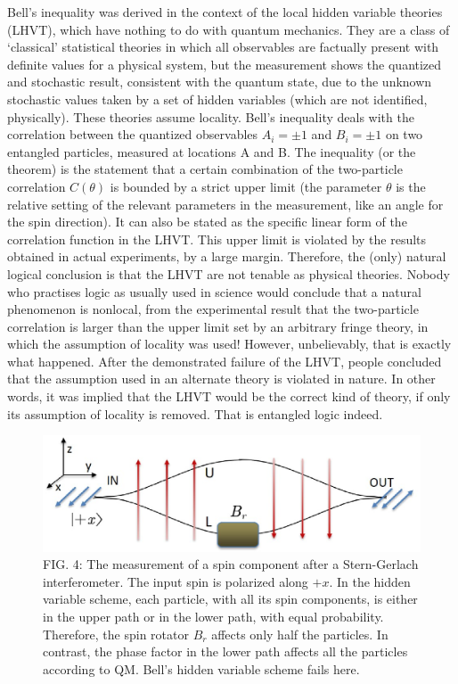 Bell's inequality \cite{chap27-key12} was derived in the context of the local hidden variable theories
(LHVT), which have nothing to do with quantum mechanics. They are a class of `classical'
statistical theories in which all observables are factually present with definite values for a
physical system, but the measurement shows the quantized and stochastic result, consistent
with the quantum state, due to the unknown stochastic values taken by a set of hidden variables (which are not identified, physically). These theories assume locality. Bell's inequality deals with the correlation between the quantized observables $A_i = \pm 1$ and $B_i = \pm 1$ on two
entangled particles, measured at locations A and B. The inequality (or the theorem) is the
statement that a certain combination of the two-particle correlation $C (\theta)$ is bounded by a
strict upper limit (the parameter $\theta$ is the relative setting of the relevant parameters in the
measurement, like an angle for the spin direction). It can also be stated as the specific linear
form of the correlation function in the LHVT. This upper limit is violated by the results
obtained in actual experiments, by a large margin. Therefore, the (only) natural logical
conclusion is that the LHVT are not tenable as physical theories. Nobody who practises
logic as usually used in science would conclude that a natural phenomenon is nonlocal, from
the experimental result that the two-particle correlation is larger than the upper limit set
by an arbitrary fringe theory, in which the assumption of locality was used! However, unbelievably, that is exactly what happened. After the demonstrated failure of the LHVT,
people concluded that the assumption used in an alternate theory is violated in nature. In
other words, it was implied that the LHVT would be the correct kind of theory, if only its
assumption of locality is removed. That is entangled logic indeed.
\begin{figure}[H]
\centering
\includegraphics[scale=0.55]{src/images/chap27/4.eps}
\caption{FIG. 4: The measurement of a spin component after a Stern-Gerlach interferometer. The input spin
is polarized along $+x$. In the hidden variable scheme, each particle, with all its spin components,
is either in the upper path or in the lower path, with equal probability. Therefore, the spin rotator
$B_r$ affects only half the particles. In contrast, the phase factor in the lower path affects all the
particles according to QM. Bell's hidden variable scheme fails here.}
\end{figure}

